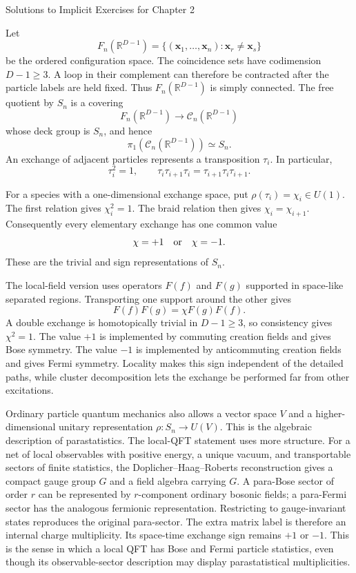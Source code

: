\begin{bankssolutions}{Solutions to Implicit Exercises for Chapter 2}

Let
\[
  F_n(\mathbb R^{D-1})=
  \{(\mathbf x_1,\ldots,\mathbf x_n):\mathbf x_r\ne\mathbf x_s\}
\]
be the ordered configuration space. The coincidence sets have codimension
$D-1\geq3$. A loop in their complement can therefore be contracted after the
particle labels are held fixed. Thus $F_n(\mathbb R^{D-1})$ is simply connected.
The free quotient by $S_n$ is a covering
\[
  F_n(\mathbb R^{D-1})\longrightarrow\mathcal C_n(\mathbb R^{D-1})
\]
whose deck group is $S_n$, and hence
\[
  \pi_1(\mathcal C_n(\mathbb R^{D-1}))\simeq S_n.
\]
An exchange of adjacent particles represents a transposition $\tau_i$. In
particular,
\[
  \tau_i^2=1,
  \qquad
  \tau_i\tau_{i+1}\tau_i=\tau_{i+1}\tau_i\tau_{i+1}.
\]

For a species with a one-dimensional exchange space, put
$\rho(\tau_i)=\chi_i\in U(1)$. The first relation gives $\chi_i^2=1$. The braid
relation then gives $\chi_i=\chi_{i+1}$. Consequently every elementary exchange
has one common value
\[
  \chi=+1\quad\hbox{or}\quad\chi=-1.
\]
These are the trivial and sign representations of $S_n$.

The local-field version uses operators $F(f)$ and $F(g)$ supported in
space-like separated regions. Transporting one support around the other gives
\[
  F(f)F(g)=\chi F(g)F(f).
\]
A double exchange is homotopically trivial in $D-1\geq3$, so consistency gives
$\chi^2=1$. The value $+1$ is implemented by commuting creation fields and
gives Bose symmetry. The value $-1$ is implemented by anticommuting creation
fields and gives Fermi symmetry. Locality makes this sign independent of the
detailed paths, while cluster decomposition lets the exchange be performed far
from other excitations.

Ordinary particle quantum mechanics also allows a vector space $V$ and a
higher-dimensional unitary representation $\rho:S_n\to U(V)$. This is the
algebraic description of parastatistics. The local-QFT statement uses more
structure. For a net of local observables with positive energy, a unique
vacuum, and transportable sectors of finite statistics, the
Doplicher--Haag--Roberts reconstruction gives a compact gauge group $G$ and a
field algebra carrying $G$. A para-Bose sector of order $r$ can be represented by $r$-component
ordinary bosonic fields; a para-Fermi sector has the analogous fermionic
representation. Restricting to gauge-invariant states reproduces the original
para-sector. The extra matrix label is therefore an internal charge
multiplicity. Its space-time exchange sign remains $+1$ or $-1$. This is the
sense in which a local QFT has Bose and Fermi particle statistics, even though
its observable-sector description may display parastatistical multiplicities.


\end{bankssolutions}
